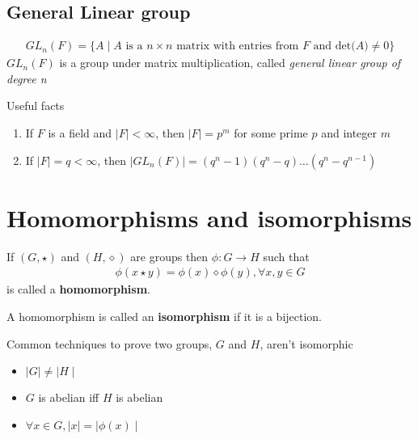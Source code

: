\documentclass[titlepage, 12pt]{article}
\begin{document}
\subsection{General Linear group}
\begin{gather*}
  GL_n(F) = \{A\mid A \textrm{ is a } n\times n\textrm{ matrix with entries from }
  F\textrm{ and det(}A)\neq 0\}
\end{gather*}
$GL_n(F)$ is a group under matrix multiplication, called \textit{general linear
group of degree n}

Useful facts
\begin{enumerate}

    \item If $F$ is a field and $|F| < \infty$, then $|F| = p^m$ for some prime
        $p$ and integer $m$

    \item If $|F| = q < \infty$, then $|GL_n(F)| = (q^n - 1)(q^n -
        q)\dots(q^n-q^{n - 1})$

\end{enumerate}


\section{Homomorphisms and isomorphisms}
If $(G, \star)$ and $(H, \diamond)$ are groups then $\phi:G\rightarrow H$ such
that
\begin{gather*}
    \phi(x\star y) = \phi(x)\diamond\phi(y), \forall x, y\in G
\end{gather*}
is called a \textbf{homomorphism}.

A homomorphism is called an \textbf{isomorphism} if it is a bijection.

Common techniques to prove two groups, $G$ and $H$, aren't isomorphic

\begin{itemize}

    \item $\mid G\mid \neq \mid H\mid$
        
    \item $G$ is abelian iff $H$ is abelian

    \item $\forall x\in G, \mid x\mid = \mid\phi(x)\mid$
\end{itemize}
\end{document}
